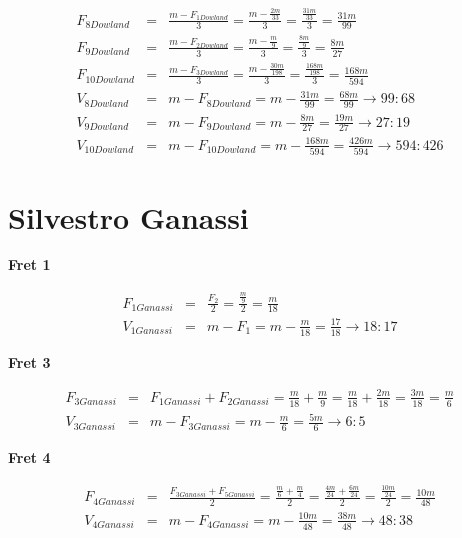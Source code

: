 \begin{eqnarray*}
    F_{8Dowland}
        &=& \frac{m-F_{1Dowland}}{3}
        = \frac{m - \frac{2m}{33}}{3}
        = \frac{\frac{31m}{33}}{3}
        = \frac{31m}{99} \\
    F_{9Dowland}
        &=& \frac{m-F_{2Dowland}}{3}
        = \frac{m - \frac{m}{9}}{3}
        = \frac{\frac{8m}{9}}{3}
        = \frac{8m}{27} \\
    F_{10Dowland}
        &=& \frac{m-F_{3Dowland}}{3}
        = \frac{m - \frac{30m}{198}}{3}
        =\frac{\frac{168m}{198}}{3}
        =\frac{168m}{594} \\
    V_{8Dowland}
        &=& m - F_{8Dowland}
        = m - \frac{31m}{99}
        = \frac{68m}{99}
        \to 99:68 \\
    V_{9Dowland}
        &=& m - F_{9Dowland}
        = m - \frac{8m}{27}
        = \frac{19m}{27}
        \to 27:19 \\
    V_{10Dowland}
        &=& m - F_{10Dowland}
        = m - \frac{168m}{594}
        = \frac{426m}{594}
        \to 594:426
\end{eqnarray*}

\section{Silvestro Ganassi}

\textbf{Fret 1}

\begin{eqnarray*}
    F_{1Ganassi}
        &=& \frac{F_2}{2}
        = \frac{\frac{m}{9}}{2}
        = \frac{m}{18} \\
    V_{1Ganassi}
        &=& m - F_1
        = m - \frac{m}{18}
        = \frac{17}{18}
        \to 18:17
\end{eqnarray*}

\textbf{Fret 3}

\begin{eqnarray*}
    F_{3Ganassi}
        &=& F_{1Ganassi} + F_{2Ganassi}
        = \frac{m}{18} + \frac{m}{9}
        = \frac{m}{18} + \frac{2m}{18}
        = \frac{3m}{18}
        = \frac{m}{6} \\
    V_{3Ganassi}
        &=& m - F_{3Ganassi}
        = m - \frac{m}{6}
        = \frac{5m}{6}
        \to 6:5
\end{eqnarray*}

\textbf{Fret 4}

\begin{eqnarray*}
    F_{4Ganassi}
        &=& \frac{F_{3Ganassi} + F_{5Ganassi}}{2}
        = \frac{\frac{m}{6} + \frac{m}{4}}{2}
        = \frac{\frac{4m}{24} + \frac{6m}{24}}{2}
        = \frac{\frac{10m}{24}}{2}
        = \frac{10m}{48} \\
    V_{4Ganassi}
        &=& m - F_{4Ganassi}
        = m - \frac{10m}{48}
        = \frac{38m}{48}
        \to 48:38
\end{eqnarray*}

